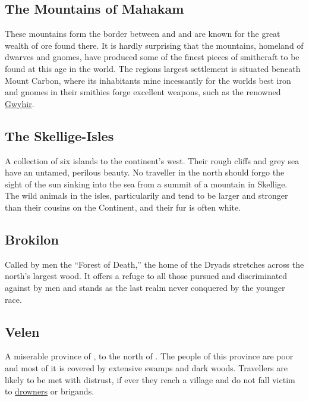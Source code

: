 \documentclass[parskip=full,11pt,%
footheight=38pt]{scrreport}
\begin{document}
\subsection{The Mountains of Mahakam}\label{region:mahakamMtns}
These mountains form the border between  and  and are known for the great wealth
of ore found there. It is hardly surprising that the mountains, homeland of dwarves and gnomes, have produced some of the finest
pieces of smithcraft to be found at this age in the world. The regions largest settlement is situated beneath Mount Carbon,
where its inhabitants mine incessantly for the worlds best iron and gnomes in their smithies forge excellent weapons, such as
the renowned \hyperref[weapon:gwyhir]{Gwyhir}.

\subsection{The Skellige-Isles}\label{region:skellige}
A collection of six islands to the continent's west. Their rough cliffs and grey sea have an untamed, perilous beauty.
No traveller in the north should forgo the sight of the sun sinking into the sea from a summit of a mountain in Skellige.
\\[1.5ex]
The wild animals in the isles, particularily  and  tend to be larger and
stronger than their cousins on the Continent, and their fur is often white.

\subsection{Brokilon}\label{region:brokilon}
Called by men the ``Forest of Death,'' the home of the Dryads stretches across the north's largest wood. It offers a refuge to
all those pursued and discriminated against by men and stands as the last realm never conquered by the younger race.

\subsection{Velen}\label{region:velen}
A miserable province of , to the north of . The people of this
province are poor and most of it is covered by extensive swamps and dark woods. Travellers are likely to be met
with distrust, if ever they reach a village and do not fall victim to \hyperref[monster:drowner]{drowners} or
brigands.
\end{document}
